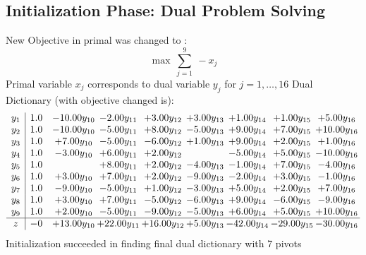 \documentclass[9pt]{article}
\begin{document}
\subsection{Initialization Phase: Dual Problem Solving}
New Objective in primal was changed to : \[ \max\ \sum_{j=1}^{9}\ - x_j \] 
Primal variable $x_j$ corresponds to dual variable $y_j$ for $j = 1,\ldots,16$
Dual Dictionary (with objective changed is): 
\[\begin{array}{c| c c@{\hskip 2pt} c@{\hskip 2pt} c@{\hskip 2pt} c@{\hskip 2pt} c@{\hskip 2pt} c@{\hskip 2pt} c@{\hskip 2pt} }
 y_{1}   &  1.0 & -10.00 y_{10} & -2.00 y_{11} & +  3.00 y_{12} & +  3.00 y_{13} & +  1.00 y_{14} & +  1.00 y_{15} & +  5.00 y_{16}\\
 y_{2}   &  1.0 & -10.00 y_{10} & -5.00 y_{11} & +  8.00 y_{12} & -5.00 y_{13} & +  9.00 y_{14} & +  7.00 y_{15} & + 10.00 y_{16}\\
 y_{3}   &  1.0 & +  7.00 y_{10} & -5.00 y_{11} & -6.00 y_{12} & +  1.00 y_{13} & +  9.00 y_{14} & +  2.00 y_{15} & +  1.00 y_{16}\\
 y_{4}   &  1.0 & -3.00 y_{10} & +  6.00 y_{11} & +  2.00 y_{12} &   & -5.00 y_{14} & +  5.00 y_{15} & -10.00 y_{16}\\
 y_{5}   &  1.0  &   & +  8.00 y_{11} & +  2.00 y_{12} & -4.00 y_{13} & -1.00 y_{14} & +  7.00 y_{15} & -4.00 y_{16}\\
 y_{6}   &  1.0 & +  3.00 y_{10} & +  7.00 y_{11} & +  2.00 y_{12} & -9.00 y_{13} & -2.00 y_{14} & +  3.00 y_{15} & -1.00 y_{16}\\
 y_{7}   &  1.0 & -9.00 y_{10} & -5.00 y_{11} & +  1.00 y_{12} & -3.00 y_{13} & +  5.00 y_{14} & +  2.00 y_{15} & +  7.00 y_{16}\\
 y_{8}   &  1.0 & +  3.00 y_{10} & +  7.00 y_{11} & -5.00 y_{12} & -6.00 y_{13} & +  9.00 y_{14} & -6.00 y_{15} & -9.00 y_{16}\\
 y_{9}   &  1.0 & +  2.00 y_{10} & -5.00 y_{11} & -9.00 y_{12} & -5.00 y_{13} & +  6.00 y_{14} & +  5.00 y_{15} & + 10.00 y_{16}\\
\hline
z    &  -0 & + 13.00 y_{10} & + 22.00 y_{11} & + 16.00 y_{12} & +  5.00 y_{13} & -42.00 y_{14} & -29.00 y_{15} & -30.00 y_{16}\\
\end{array}\]
Initialization succeeded in finding final dual dictionary with 7 pivots
\end{document}
